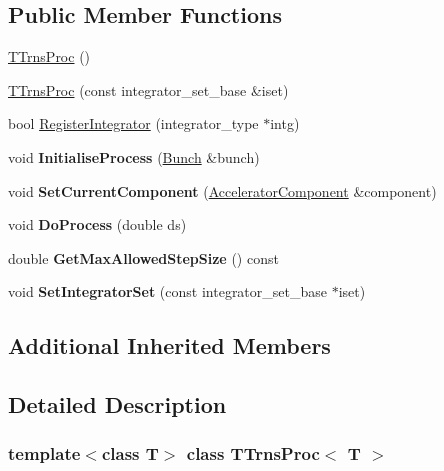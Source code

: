 \subsection*{Public Member Functions}
\begin{DoxyCompactItemize}
\item 
\hyperlink{classTTrnsProc_afbcef160143ed7d5994327d0ab188135}{T\+Trns\+Proc} ()
\item 
\hyperlink{classTTrnsProc_a2016e23535409041dae3df438dba63d3}{T\+Trns\+Proc} (const integrator\+\_\+set\+\_\+base \&iset)
\item 
bool \hyperlink{classTTrnsProc_ac8fea60c9ccdfc1ae17f3a90f181e54b}{Register\+Integrator} (integrator\+\_\+type $\ast$intg)
\item 
\mbox{\label{classTTrnsProc_a52a0b2085d6284bf16472e359baf09b7}} 
void {\bfseries Initialise\+Process} (\hyperlink{classBunch}{Bunch} \&bunch)
\item 
\mbox{\label{classTTrnsProc_a9a419b219489add9ebe44dcff0f866ab}} 
void {\bfseries Set\+Current\+Component} (\hyperlink{classAcceleratorComponent}{Accelerator\+Component} \&component)
\item 
\mbox{\label{classTTrnsProc_a75102db7909aaf354ece752c93318128}} 
void {\bfseries Do\+Process} (double ds)
\item 
\mbox{\label{classTTrnsProc_a21d12d58a7b61e2d447f30a7d8a47b49}} 
double {\bfseries Get\+Max\+Allowed\+Step\+Size} () const
\item 
\mbox{\label{classTTrnsProc_ad3607bdbb1860668739a8a9e8c97bc76}} 
void {\bfseries Set\+Integrator\+Set} (const integrator\+\_\+set\+\_\+base $\ast$iset)
\end{DoxyCompactItemize}
\subsection*{Additional Inherited Members}


\subsection{Detailed Description}
\subsubsection*{template$<$class T$>$\newline
class T\+Trns\+Proc$<$ T $>$}


